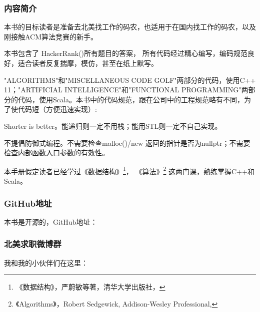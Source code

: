 \subsubsection{内容简介}
本书的目标读者是准备去北美找工作的码农，也适用于在国内找工作的码农，以及刚接触ACM算法竞赛的新手。

本书包含了 HackerRank()所有题目的答案，
所有代码经过精心编写，编码规范良好，适合读者反复揣摩，模仿，甚至在纸上默写。

"ALGORITHMS"和"MISCELLANEOUS CODE GOLF"两部分的代码，使用C++ 11；"ARTIFICIAL INTELLIGENCE"和"FUNCTIONAL PROGRAMMING"两部分的代码，使用Scala。本书中的代码规范，跟在公司中的工程规范略有不同，为了使代码短（方便迅速实现）:

\begindot
\item Shorter is better。能递归则一定不用栈；能用STL则一定不自己实现。

\item 不提倡防御式编程。不需要检查malloc()/new 返回的指针是否为nullptr；不需要检查内部函数入口参数的有效性。
\myenddot

本手册假定读者已经学过《数据结构》\footnote{《数据结构》，严蔚敏等著，清华大学出版社，
}，
《算法》\footnote{《Algorithms》，Robert Sedgewick, Addison-Wesley Professional, }
这两门课，熟练掌握C++和Scala。

\subsubsection{GitHub地址}
本书是开源的，GitHub地址：

\subsubsection{北美求职微博群}
我和我的小伙伴们在这里：
